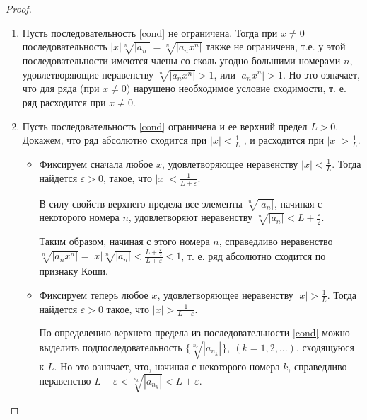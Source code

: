 \begin{proof}
\begin{enumerate}
    \item Пусть последовательность \eqref{cond} не ограничена. Тогда при $x \neq 0$ последовательность $|x|\sqrt[n]{|a_n|} = \sqrt[n]{|a_n x^n|}$
    также не ограничена, т.е. у этой последовательности имеются члены со сколь угодно большими номерами $n$, удовлетворяющие неравенству $\sqrt[n]{|a_n x^n|} > 1$, или $|a_n x^n| > 1$.
    Но это означает, что для ряда (при $x\neq 0$) нарушено необходимое условие сходимости, т. е. ряд расходится при $x\neq 0$.
    \item Пусть последовательность \eqref{cond} ограничена и ее верхний предел $L > 0$. Докажем, что ряд абсолютно сходится при $|x| < \frac{1}{L}$ , и расходится при $|x| > \frac{1}{L}$.
    \begin{itemize}
        \item Фиксируем сначала любое $x$, удовлетворяющее неравенству $|x| < \frac{1}{L}$. Тогда найдется $\varepsilon > 0$, такое, что $|x| < \frac{1}{L+\varepsilon}$.

        В силу свойств верхнего предела все элементы $\sqrt[n]{|a_n|}$, начиная с некоторого номера $n$, удовлетворяют неравенству $\sqrt[n]{|a_n|} < L + \frac{\varepsilon}{2}$.

        Таким образом, начиная с этого номера $n$, справедливо неравенство $\sqrt[n]{|a_n x^n|} = |x|\sqrt[n]{|a_n|} < \frac{L + \frac{\varepsilon}{2}}{L+\varepsilon} < 1$, т. е. ряд абсолютно сходится по признаку Коши.
        \item Фиксируем теперь любое $x$, удовлетворяющее неравенству $|x| > \frac{1}{L}$. Тогда найдется $\varepsilon > 0$ такое, что $|x| > \frac{1}{L - \varepsilon}$.

        По определению верхнего предела из последовательности \eqref{cond} можно выделить подпоследовательность $\{\sqrt[n_k]{|a_{n_k}|}\},~(k=1,2,\dots)$, сходящуюся к $L$.
        Но это означает, что, начиная с некоторого номера $k$, справедливо неравенство $L-\varepsilon< \sqrt[n_k]{|a_{n_k}|} <L+\varepsilon$.


\end{itemize}
\end{enumerate}
\end{proof}
